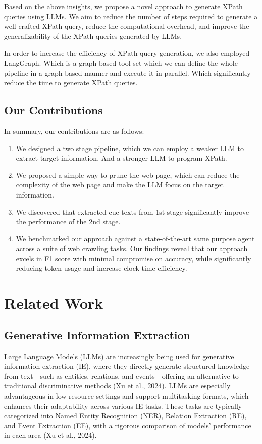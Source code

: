 \documentclass[a4paper]{article}
\begin{document}
Based on the above insights, we propose a novel approach to generate XPath queries using LLMs. We aim to reduce the number of steps required to generate a well-crafted XPath query, reduce the computational overhead, and improve the generalizability of the XPath queries generated by LLMs.

In order to increase the efficiency of XPath query generation, we also employed LangGraph. Which is a graph-based tool set which we can define the whole pipeline in a graph-based manner and execute it in parallel. Which significantly reduce the time to generate XPath queries.

\subsection{Our Contributions}

In summary, our contributions are as follows:

\begin{enumerate}
  \item We designed a two stage pipeline, which we can employ a weaker LLM to extract target information. And a stronger LLM to program XPath.
  \item We proposed a simple way to prune the web page, which can reduce the complexity of the web page and make the LLM focus on the target information.
  \item We discovered that extracted cue texts from 1st stage significantly improve the performance of the 2nd stage.
  \item We benchmarked our approach against a state-of-the-art same purpose agent across a suite of web crawling tasks. Our findings reveal that our approach excels in F1 score with minimal compromise on accuracy, while significantly reducing token usage and increase clock-time efficiency.
\end{enumerate}

\section{Related Work}
\subsection{Generative Information Extraction}
Large Language Models (LLMs) are increasingly being used for generative information extraction (IE), where they directly generate structured knowledge from text—such as entities, relations, and events—offering an alternative to traditional discriminative methods (Xu et al., 2024). LLMs are especially advantageous in low-resource settings and support multitasking formats, which enhances their adaptability across various IE tasks. These tasks are typically categorized into Named Entity Recognition (NER), Relation Extraction (RE), and Event Extraction (EE), with a rigorous comparison of models’ performance in each area (Xu et al., 2024).
\end{document}
